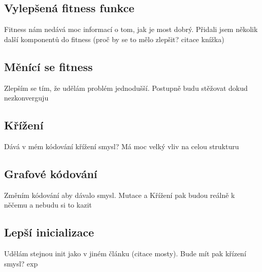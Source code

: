 \subsection{Vylepšená fitness funkce}

Fitness nám nedává moc informací o tom, jak je most dobrý. Přidali jsem několik další komponentů do fitness (proč by se to mělo zlepšit? citace knížka)

\subsection{Měnící se fitness}

Zlepším se tím, že udělám problém jednodušší. Postupně budu stěžovat dokud nezkonverguju

\subsection{Křížení}

Dává v mém kódování křížení smysl? Má moc velký vliv na celou strukturu

\subsection{Grafové kódování}

Změním kódování aby dávalo smysl. Mutace a Křížení pak budou reálně k něčemu a nebudu si to kazit

\subsection{Lepší inicializace}

Udělám stejnou init jako v jiném článku (citace mosty). Bude mít pak křízení smysl? exp
